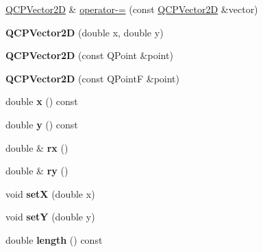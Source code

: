 \begin{DoxyCompactItemize}
\item 
\hyperlink{class_q_c_p_vector2_d}{Q\+C\+P\+Vector2D} \& \hyperlink{class_q_c_p_vector2_d_a3a2e906bb924983bb801e89f28a3d566}{operator-\/=} (const \hyperlink{class_q_c_p_vector2_d}{Q\+C\+P\+Vector2D} \&vector)
\item 
\mbox{\label{class_q_c_p_vector2_d_a47bd86cebc5588dad6ec84349d9098d4}} 
{\bfseries Q\+C\+P\+Vector2D} (double x, double y)
\item 
\mbox{\label{class_q_c_p_vector2_d_ad8f30a064dc37c90a7ba5e6732ceb5bb}} 
{\bfseries Q\+C\+P\+Vector2D} (const Q\+Point \&point)
\item 
\mbox{\label{class_q_c_p_vector2_d_a3c16eba1006c210ffc3299253fef2339}} 
{\bfseries Q\+C\+P\+Vector2D} (const Q\+PointF \&point)
\item 
\mbox{\label{class_q_c_p_vector2_d_a4a099e1f9788d52cb46deb8139aa6195}} 
double {\bfseries x} () const
\item 
\mbox{\label{class_q_c_p_vector2_d_a6398fb643ba380d7961a4b208f4eecf1}} 
double {\bfseries y} () const
\item 
\mbox{\label{class_q_c_p_vector2_d_a1516252dac9eb5ffb7ddb17fb26e60e0}} 
double \& {\bfseries rx} ()
\item 
\mbox{\label{class_q_c_p_vector2_d_aa8f59a5b54aec8be8e4d1f39db892fea}} 
double \& {\bfseries ry} ()
\item 
\mbox{\label{class_q_c_p_vector2_d_ab4249e6ce7bfc37be56f014c54b761ae}} 
void {\bfseries setX} (double x)
\item 
\mbox{\label{class_q_c_p_vector2_d_ada288019aa8cd51e3b30acfc07b461dc}} 
void {\bfseries setY} (double y)
\item 
\mbox{\label{class_q_c_p_vector2_d_a10adb5ab031fe94f0b64a3c5aefb552e}} 
double {\bfseries length} () const
\item 
\mbox{\label{class_q_c_p_vector2_d_a766585459d84cb149334fda1a498b2e5}} 

\end{DoxyCompactItemize}
